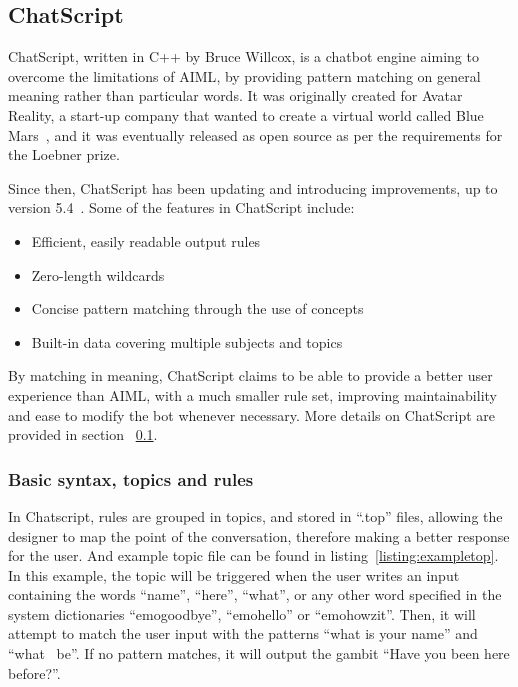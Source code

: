 \subsection{ChatScript}
\label{subsec:chatscript}

ChatScript, written in C++ by Bruce Willcox, is a chatbot engine aiming to overcome the limitations of \ac{AIML}, by providing pattern matching on general meaning rather than particular words. It was originally created for Avatar Reality, a start-up company that wanted to create a virtual world called Blue Mars~\cite{Wilcox2010suzzete}, and it was eventually released as open source as per the requirements for the Loebner prize.

Since then, ChatScript has been updating and introducing improvements, up to version 5.4~\cite{ChatScriptSourceForge}. Some of the features in ChatScript include:
\begin{itemize}
 \item Efficient, easily readable output rules
 \item Zero-length wildcards
 \item Concise pattern matching through the use of concepts
 \item Built-in data covering multiple subjects and topics
\end{itemize}

By matching in meaning, ChatScript claims to be able to provide a better user experience than \ac{AIML}, with a much smaller rule set, improving maintainability and ease to modify the bot whenever necessary. More details on ChatScript are provided in section ~\ref{subsec:chatscript}.

\subsubsection{Basic syntax, topics and rules}

In Chatscript, rules are grouped in topics, and stored in ``.top'' files, allowing the designer to map the point of the conversation, therefore making a better response for the user. And example topic file can be found in listing~\ref{listing:exampletop}. In this example, the topic will be triggered when the user writes an input containing the words ``name'', ``here'', ``what'', or any other word specified in the system dictionaries ``emogoodbye'', ``emohello'' or ``emohowzit''. Then, it will attempt to match the user input with the patterns ``what is your name'' and ``what ~be''. If no pattern matches, it will output the gambit ``Have you been here before?''.

